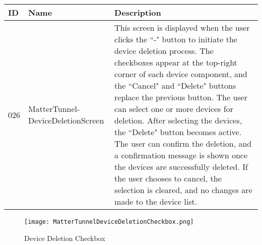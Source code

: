 \documentclass[conference]{IEEEtran}
\begin{document}
\begin{enumerate}[itemsep=2ex, parsep=1ex]
\begin{enumerate}[itemsep=2ex, parsep=1ex]
	      	      \begin{table}[h!]
	      	      	\def\arraystretch{1.24} \small
	      	      	\begin{tabular}{|p{1.2cm}|p{2.5cm}|p{4.0cm}|}
	      	      		\hline
	      	      		ID  & Name                              & Description                                                                                                                                                                                                                                                                                                                                                                                                                                                                                                                                                                                        \\
	      	      		\hline
	      	      		026 & MatterTunnel-DeviceDeletionScreen & This screen is displayed when the user clicks the ``-" button to initiate the device deletion process. The checkboxes appear at the top-right corner of each device component, and the ``Cancel" and ``Delete" buttons replace the previous button. The user can select one or more devices for deletion. After selecting the devices, the ``Delete" button becomes active. The user can confirm the deletion, and a confirmation message is shown once the devices are successfully deleted. If the user chooses to cancel, the selection is cleared, and no changes are made to the device list. \\
	      	      		\hline
	      	      	\end{tabular}
	      	      \end{table}
	      	      
	      	      \begin{figure}[h!]
	      	      	\centering
	      	      	\texttt{[image: MatterTunnelDeviceDeletionCheckbox.png]}
	      	      	\caption{Device Deletion Checkbox}
	      	      	\label{fig:DeviceDeletionCheckbox}
	      	      \end{figure}
	      	      	      	      

\end{enumerate}
\end{enumerate}
\end{document}

